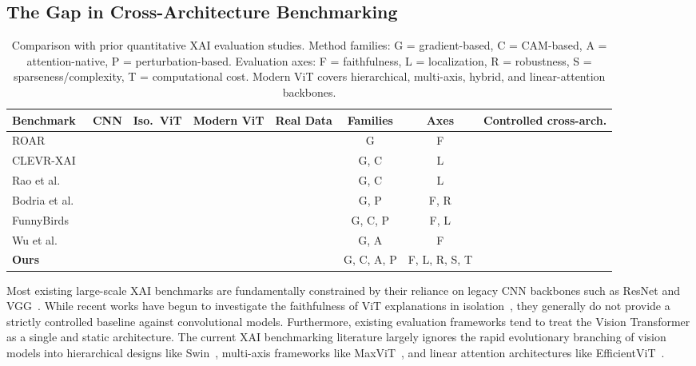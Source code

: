 \documentclass[final,5p,times,twocolumn]{elsarticle}
\newcommand{\cmark}{\textcolor{ForestGreen}{\ding{51}}}
\newcommand{\xmark}{\textcolor{BrickRed}{\ding{55}}}
\begin{document}
\subsection{The Gap in Cross-Architecture Benchmarking}

\begin{table}[t]
\centering
\caption{Comparison with prior quantitative XAI evaluation studies. Method families: G = gradient-based, C = CAM-based, A = attention-native, P = perturbation-based. Evaluation axes: F = faithfulness, L = localization, R = robustness, S = sparseness/complexity, T = computational cost. Modern ViT covers hierarchical, multi-axis, hybrid, and linear-attention backbones.}
\label{tab:benchmark_comparison}
\setlength{\tabcolsep}{5pt}
\begin{tabular}{lccccccc}
\toprule
\textbf{Benchmark} & \textbf{CNN} & \textbf{Iso.\ ViT} & \textbf{Modern ViT} & \textbf{Real Data} & \textbf{Families} & \textbf{Axes} & \textbf{Controlled cross-arch.} \\
\midrule
ROAR~\cite{hooker2019roar} & \cmark & \xmark & \xmark & \cmark & G & F & \xmark \\
CLEVR-XAI~\cite{arras2022clevrxai} & \cmark & \xmark & \xmark & \xmark & G, C & L & \xmark \\
Rao et al.~\cite{rao2022attribution} & \cmark & \xmark & \xmark & \cmark & G, C & L & \xmark \\
Bodria et al.~\cite{bodria2023benchmarking} & \cmark & \xmark & \xmark & \cmark & G, P & F, R & \xmark \\
FunnyBirds~\cite{hesse2023funnybirds} & \cmark & \cmark & \xmark & \xmark & G, C, P & F, L & \cmark \\
Wu et al.~\cite{wu2024faithfulness} & \xmark & \cmark & \xmark & \cmark & G, A & F & \xmark \\
\midrule
\textbf{Ours} & \cmark & \cmark & \cmark & \cmark & G, C, A, P & F, L, R, S, T & \cmark \\
\bottomrule
\end{tabular}
\end{table}

Most existing large-scale XAI benchmarks are fundamentally constrained by their reliance on legacy CNN backbones such as ResNet and VGG~\cite{hooker2019roar,rao2022attribution,brandt2023precise}. While recent works have begun to investigate the faithfulness of ViT explanations in isolation~\cite{wu2024faithfulness}, they generally do not provide a strictly controlled baseline against convolutional models. Furthermore, existing evaluation frameworks tend to treat the Vision Transformer as a single and static architecture. The current XAI benchmarking literature largely ignores the rapid evolutionary branching of vision models into hierarchical designs like Swin~\cite{liu2021swin}, multi-axis frameworks like MaxViT~\cite{tu2022maxvit}, and linear attention architectures like EfficientViT~\cite{cai2023efficientvit}. 
\end{document}
